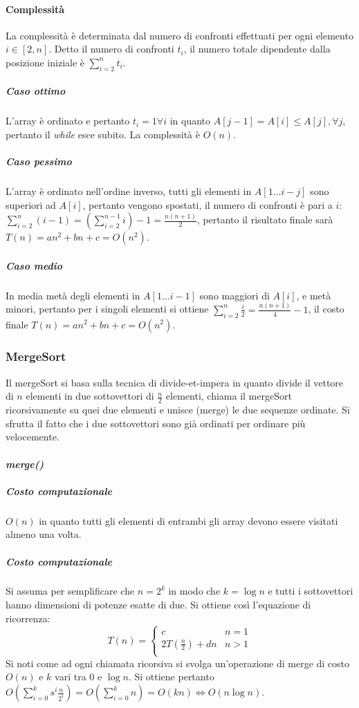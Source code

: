 \paragraph{Complessit\`a}
La complessit\`a \`e determinata dal numero di confronti effettuati per ogni elemento $i\in [2, n]$. Detto il numero di confronti $t_i$, il numero totale dipendente dalla posizione 
iniziale \`e $\sum\limits_{i=2}^n t_i$.
\subparagraph{Caso ottimo}
L'array \`e ordinato e pertanto $t_i = 1 \forall i$ in quanto $A[j-1] = A[i]\le A[j], \forall j$, pertanto il \emph{while} esce subito. La complessit\`a \`e $O(n)$. 
\subparagraph{Caso pessimo}
L'array \`e ordinato nell'ordine inverso, tutti gli elementi in $A[1\dots i - j]$ sono superiori ad $A[i]$, pertanto vengono spostati, il numero di confronti \`e pari a $i$: 
$\sum\limits_{i=2}^n(i-1) = (\sum\limits_{i = 2}^{n-1}i)-1 = \frac{n(n+1)}{2}$, pertanto il risultato finale sar\`a $T(n) = an^2+bn+c = O(n^2)$. 
\subparagraph{Caso medio}
In media met\`a degli elementi in $A[1\dots i - 1]$ sono maggiori di $A[i]$, e met\`a minori, pertanto per i singoli elementi si ottiene $\sum\limits_{i = 2}^n\frac{i}{2}=\frac{n(n+1)}{4}
-1$, il costo finale $T(n) = an^2+bn+c = O(n^2)$. 
\subsubsection{MergeSort}
Il mergeSort si basa sulla tecnica di divide-et-impera in quanto divide il vettore di $n$ elementi in due sottovettori di $\frac{n}{2}$ elementi, chiama il
mergeSort ricorsivamente su quei due elementi e unisce (merge) le due sequenze ordinate. Si sfrutta il fatto che i due sottovettori sono gi\`a ordinati per
ordinare pi\`u velocemente.
\paragraph{\emph{merge()}}

\subparagraph{Costo computazionale} $O(n)$ in quanto tutti gli elementi di entrambi gli array devono essere visitati almeno una volta. 

\subparagraph{Costo computazionale} Si assuma per semplificare che $n = 2^k$ in modo che $k=\log n$ e tutti i sottovettori hanno dimensioni di potenze 
esatte di due. Si ottiene cos\`i l'equazione di ricorrenza:
\begin{equation*}
T(n)=\begin{cases}
c\quad\quad & n=1\\
2T(\frac{n}{2})+dn & n>1\\
\end{cases}
\end{equation*}
Si noti come ad ogni chiamata ricorsiva si svolga un'operazione di merge di costo $O(n)$ e $k$ vari tra $0$ e $\log n$. Si ottiene pertanto 
$O(\sum\limits_{i=0}^ks^i\frac{n}{2^i})=O(\sum\limits_{i=0}^kn)=O(kn)\Leftrightarrow O(n\log n)$. 
